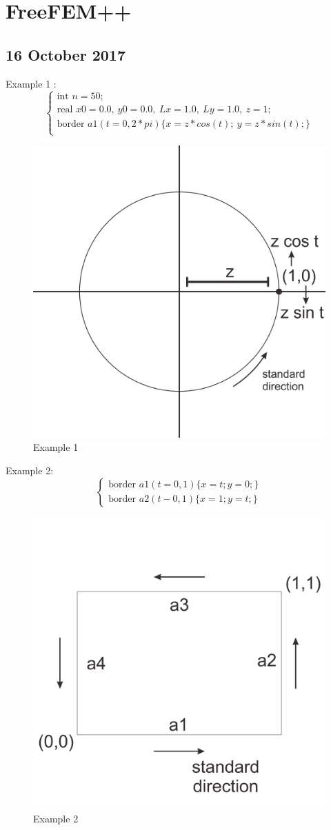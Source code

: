 \documentclass[a4paper,10pt]{article}
\begin{document}
\newpage
\section{FreeFEM++}
\subsection{16 October 2017}
Example 1 :
\begin{equation}\nonumber
\begin{cases}
\text{int } n=50;\\
\text{real } x0=0.0 ,\ y0=0.0 ,\ Lx=1.0 ,\ Ly=1.0 ,\ z=1; \\
\text{border } a1(t=0, 2*pi) \{x=z*cos(t); \ y=z*sin(t); \}\\
\end{cases}
\end{equation}

\begin{figure}[h!]
	\centering
	\includegraphics[width=0.37\linewidth]{picture/example1}
	\caption{Example 1}
	\label{fig:example1}
\end{figure}

Example 2:
\begin{equation}\nonumber
\begin{cases}
\text{border } a1(t=0,1) \{ x=t;y=0; \}\\
\text{border } a2(t-0,1) \{ x=1;y=t; \}
\end{cases}
\end{equation}

\begin{figure}[h!]
	\centering
	\includegraphics[width=0.37\linewidth]{picture/example2}
	\caption{Example 2}
	\label{fig:example2}
\end{figure}
\end{document}
